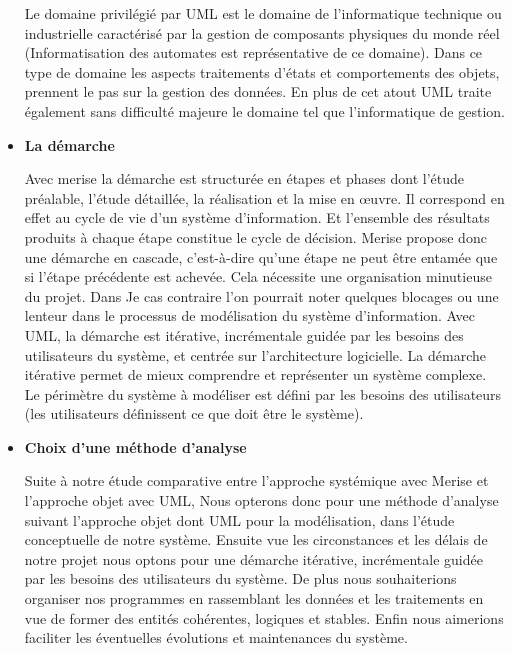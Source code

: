 \begin{itemize}
	Le domaine privilégié par UML est le domaine de l’informatique technique ou industrielle caractérisé par la gestion de composants physiques du monde réel (Informatisation des automates est représentative de ce domaine). Dans ce type de domaine les aspects traitements d’états et comportements des objets, prennent le pas sur la gestion des données. En plus de cet atout UML traite également sans difficulté majeure le domaine tel que l’informatique de gestion.

	\item \textbf{La démarche}

	      Avec merise la démarche est structurée en étapes et phases dont l’étude préalable, l’étude
	      détaillée, la réalisation et la mise en œuvre. Il correspond en effet au cycle de vie d’un système
	      d’information. Et l’ensemble des résultats produits à chaque étape constitue le cycle de décision.
	      Merise propose donc une démarche en cascade, c’est-à-dire qu’une étape ne peut être entamée
	      que si l’étape précédente est achevée. Cela nécessite une organisation minutieuse du projet.
	      Dans Je cas contraire l’on pourrait noter quelques blocages ou une lenteur dans le processus
	      de modélisation du système d’information. Avec UML, la démarche est itérative, incrémentale
	      guidée par les besoins des utilisateurs du système, et centrée sur l’architecture logicielle. La
	      démarche itérative permet de mieux comprendre et représenter un système complexe. Le
	      périmètre du système à modéliser est défini par les besoins des utilisateurs (les utilisateurs
	      définissent ce que doit être le système).

	\item \textbf{Choix d’une méthode d’analyse}

	Suite à notre étude comparative entre l’approche systémique avec Merise et l’approche objet avec UML, Nous opterons donc pour une méthode d’analyse suivant l’approche objet dont UML pour la modélisation, dans l’étude conceptuelle de notre système.
	Ensuite vue les circonstances
	      et les délais de notre projet nous optons pour une démarche itérative, incrémentale guidée par
	      les besoins des utilisateurs du système. De plus nous souhaiterions organiser nos programmes
	      en rassemblant les données et les traitements en vue de former des entités cohérentes, logiques
	      et stables. Enfin nous aimerions faciliter les éventuelles évolutions et maintenances du système.
\end{itemize}

